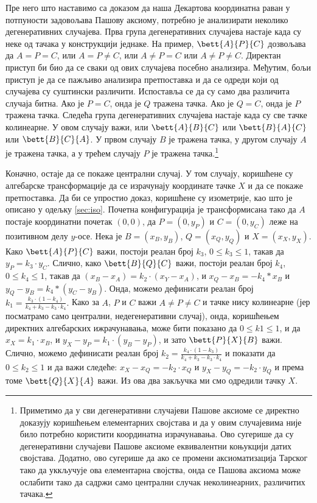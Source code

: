 Пре него што наставимо са доказом да наша Декартова координатна раван
у потпуности задовољава Пашову аксиому, потребно је анализирати
неколико дегенеративних случајева. Прва група дегенеративних случајева
настаје када су неке од тачака у конструкцији једнаке. На пример,
$\bett{A}{P}{C}$ дозвољава да $A=P=C$, или $A=P\neq C$, или $A\neq
P=C$ или $A \neq P \neq C$. Директан приступ би био да се сваки од
ових случајева посебно анализира. Међутим, бољи приступ је да се
пажљиво анализира претпоставка и да се одреди који од случајева су
суштински различити. Испоставља се да су само два различита случаја
битна. Ако је $P=C$, онда је $Q$ тражена тачка. Ако је $Q=C$, онда је
$P$ тражена тачка. Следећа група дегенеративних случајева настаје када
су све тачке колинеарне. У овом случају важи, или $\bett{A}{B}{C}$ или
$\bett{B}{A}{C}$ или $\bett{B}{C}{A}$. У првом случају $B$ је тражена
тачка, у другом случају $A$ је тражена тачка, а у трећем случају $P$
је тражена тачка.\footnote{Приметимо да у сви дегенеративни случајеви
  Пашове аксиоме се директно доказују коришћењем елементарних
  својстава и да у овим случајевима није било потребно користити
  координатна израчунавања. Ово сугерише да су дегенеративни случајеви
  Пашове аксиоме еквивалентни коњукцији датих својстава. Додатно, ово
  сугерише да ако се промени аксиоматизација Тарског тако да уккључује
  ова елементарна својства, онда се Пашова аксиома може ослабити тако
  да садржи само централни случак неколинеарних, различитих тачака.}


Коначно, остаје да се покаже централни случај. У том случају,
коришћене су алгебарске трансформације да се израчунају координате
тачке $X$ и да се покаже претпоставка. Да би се упростио доказ,
коришћене су изометрије, као што је описано у одељку
\ref{sec:iso}. Почетна конфигурација је трансформисана тако да $A$
постаје координатни почетак $(0, 0)$, да $P = (0, y_P)$ и $C = (0,
y_C)$ леже на позитивном делу $y$-осе. Нека је $B=(x_B, y_B)$,
$Q=(x_Q, y_Q)$ и $X = (x_X, y_X)$. Како $\bett{A}{P}{C}$ важи, постоји
реалан број $k_3$, $0 \le k_3 \le 1$, такав да $y_P = k_3\cdot y_C$.
Слично, како $\bett{B}{Q}{C}$ важи, постоји реалан број $k_4$, $0 \le
k_4 \le 1$, такав да $(x_B - x_A) = k_2 \cdot (x_Y - x_A)$, и $x_Q -
x_B = -k_4*x_B$ и $y_Q - y_B = k_4*(y_C - y_B)$. Онда, можемо
дефинисати реалан број $k_1 = \frac{k_3\cdot (1 - k_4)}{k_4 + k_3 -
  k_3\cdot k_4}.$ Како за $A$, $P$ и $C$ важи $A \neq P \neq C$ и
тачке нису колинеарне (јер посматрамо само централни, недегенеративни
случај), онда, коришћењем директних алгебарских ижрачунавања, може
бити показано да $0 \le k1 \le 1$, и да $ x_X = k_1 \cdot x_B$, и $y_X
- y_P = k_1\cdot (y_B - y_P)$, и зато $\bett{P}{X}{B}$ важи. Слично,
можемо дефинисати реалан број $k_2 = \frac{k_4\cdot (1 - k_3)}{k_4 +
  k_3 - k_3\cdot k_4}$ и показати да $0 \le k_2 \le 1$ и да важи
следеће: $x_X - x_Q = -k_2\cdot x_Q$ и $y_X - y_Q = - k_2\cdot y_Q$ и
према томе $\bett{Q}{X}{A}$ важи. Из ова два закључка ми смо одредили
тачку $X$.


